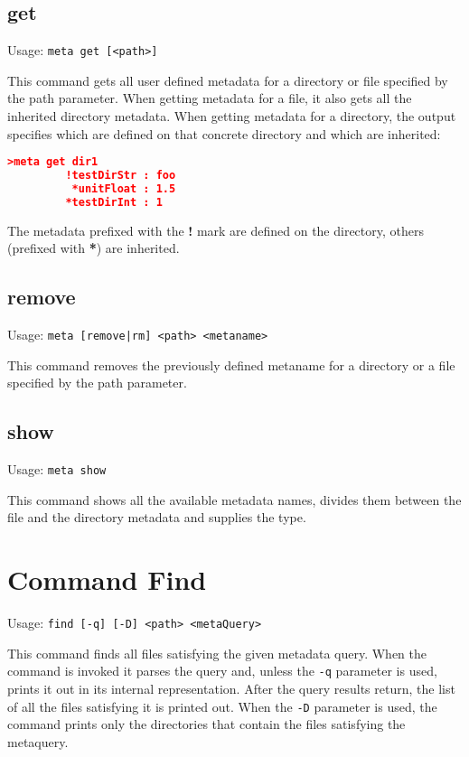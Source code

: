 \subsection{get}

Usage: \texttt{meta get [<path>]}

This command gets all user defined metadata for a directory or file specified by
the path parameter. When getting metadata for a file, it also gets
all the inherited directory metadata. When getting metadata for a
directory, the output specifies which are defined on that concrete
directory and which are inherited:
\begin{lstlisting}[language=json]
>meta get dir1
         !testDirStr : foo
          *unitFloat : 1.5
         *testDirInt : 1
\end{lstlisting}
The metadata prefixed with the \textbf{!} mark are defined on the
directory, others (prefixed with \textbf{*}) are inherited.

\subsection{remove}

Usage: \texttt{meta [remove|rm] <path> <metaname>}

This command removes the previously defined metaname for a directory or a file
specified by the path parameter.

\subsection{show}

Usage: \texttt{meta show}

This command shows all the available metadata names, divides them between the
file and the directory metadata and supplies the type.

\section{Command Find}

Usage: \texttt{find [-q] [-D] <path> <metaQuery>}

This command finds all files satisfying the given metadata query. When the
command is invoked it parses the query and, unless the \texttt{-q}
parameter is used, prints it out in its internal
representation. After the query results return, the list of all
the files satisfying it is printed out. When the \texttt{-D}
parameter is used, the command prints only the directories
that contain the files satisfying the metaquery.

